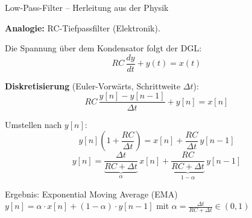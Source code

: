 \documentclass[%
  aspectratio=169,
  10pt
]{beamer}
\begin{document}
\begin{frame}{Low-Pass-Filter -- Herleitung aus der Physik}

\textbf{Analogie:} RC-Tiefpassfilter (Elektronik).

Die Spannung über dem Kondensator folgt der DGL:
\[
  RC \, \frac{dy}{dt} + y(t) = x(t)
\]

\textbf{Diskretisierung} (Euler-Vorwärts, Schrittweite $\Delta t$):
\[
  RC \, \frac{y[n] - y[n-1]}{\Delta t} + y[n] = x[n]
\]

\pause
Umstellen nach $y[n]$:
\[
  y[n]\left(1 + \frac{RC}{\Delta t}\right) = x[n] + \frac{RC}{\Delta t}\,y[n-1]
\]
\[
  y[n] = \underbrace{\frac{\Delta t}{RC + \Delta t}}_{\alpha}\,x[n]
       + \underbrace{\frac{RC}{RC + \Delta t}}_{1-\alpha}\,y[n-1]
\]

\pause
\begin{block}{Ergebnis: Exponential Moving Average (EMA)}
  $y[n] = \alpha \cdot x[n] + (1-\alpha) \cdot y[n-1]$
  mit $\alpha = \frac{\Delta t}{RC + \Delta t} \in (0,1)$
\end{block}

\end{frame}
\end{document}
